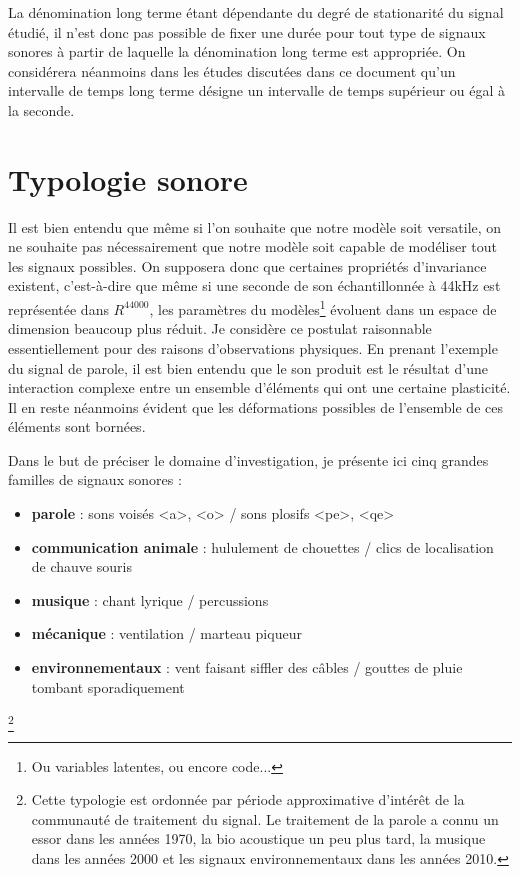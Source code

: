 La dénomination \og long terme \fg  étant dépendante du degré de stationarité du signal étudié, il n'est donc pas possible de fixer une durée pour tout type de signaux sonores à partir de laquelle la dénomination \og long terme \fg est appropriée. On considérera néanmoins dans les études discutées dans ce document qu'un intervalle de temps  \og long terme \fg désigne un intervalle de temps supérieur ou égal à la seconde.

\section{ \nmu Typologie sonore} \label{sec:typologie}

Il est bien entendu que même si l'on souhaite que notre modèle soit versatile, on ne souhaite pas nécessairement que notre modèle soit capable de modéliser tout les signaux possibles. On supposera donc que certaines propriétés d'invariance existent, c'est-à-dire que même si une seconde de son échantillonnée à 44kHz est représentée dans $R^{44000}$, les paramètres du modèles\footnote{Ou variables latentes, ou encore code...} évoluent dans un espace de dimension beaucoup plus réduit. Je considère ce postulat raisonnable essentiellement pour des raisons d'observations physiques. En prenant l'exemple du signal de parole, il est bien entendu que le son produit est le résultat d'une interaction complexe entre un ensemble d'éléments qui ont une certaine plasticité. Il en reste néanmoins évident que les déformations possibles de l'ensemble de ces éléments sont bornées.

Dans le but de préciser le domaine d'investigation, je présente ici cinq grandes familles de signaux sonores :
\begin{itemize}
  \item \textbf{parole} : sons voisés <a>, <o> / sons plosifs <pe>, <qe>
  \item \textbf{communication animale} : hululement de chouettes / clics de localisation de chauve souris
  \item \textbf{musique} : chant lyrique / percussions
  \item \textbf{mécanique} : ventilation / marteau piqueur
  \item \textbf{environnementaux} : vent faisant siffler des câbles / gouttes de pluie tombant sporadiquement
\end{itemize}\footnote{Cette typologie est ordonnée par période approximative d'intérêt de la communauté de traitement du signal. Le traitement de la parole a connu un essor dans les années 1970, la bio acoustique un peu plus tard, la musique dans les années 2000 et les signaux environnementaux dans les années 2010.}

